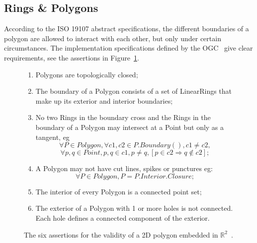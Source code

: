 \documentclass[a4paper,parskip=half,11pt]{scrartcl}
\newcommand{\eg}{eg}
\begin{document}
\subsection{Rings \& Polygons}

According to the ISO 19107 abstract specifications, the different boundaries of a polygon are allowed to interact with each other, but only under certain circumstances.
The implementation specifications defined by the OGC~\citep{OGC-SF} give clear requirements, see the assertions in Figure~\ref{fig:ogcsf_definitions}.
\begin{figure}
  \centering
\begin{boxedminipage}{.9\textwidth}
  {\small
\begin{enumerate}
  \item Polygons are topologically closed;
  \item The boundary of a Polygon consists of a set of LinearRings that make up its exterior and interior boundaries;
  \item No two Rings in the boundary cross and the Rings in the boundary of a Polygon may intersect at a Point but only as a tangent, \eg\ 
    \[
       \forall P \in Polygon, \forall c1, c2 \in P.Boundary(), c1 \neq c2,
    \]
    \[
        \forall p, q \in Point, p, q \in c1, p \neq q, [p \in c2 \Rightarrow q \notin c2];
    \]
  \item A Polygon may not have cut lines, spikes or punctures \eg:
    \[
       \forall P \in Polygon, P = P.Interior.Closure;
    \]
  \item The interior of every Polygon is a connected point set;
  \item The exterior of a Polygon with 1 or more holes is not connected. Each hole defines a connected component of the exterior.
\end{enumerate}
}
\end{boxedminipage}
\caption{The six assertions for the validity of a 2D polygon embedded in $\mathbb{R}^2$~\citep[pages 26--27]{OGC-SF}.}\label{fig:ogcsf_definitions}
\end{figure}
\end{document}
